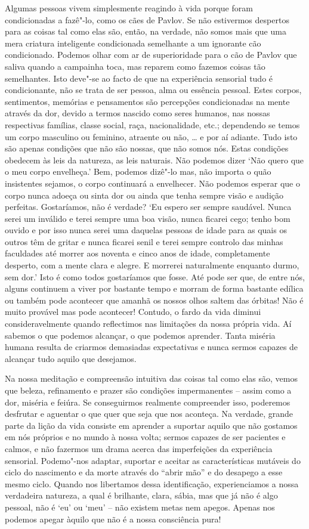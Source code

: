Algumas pessoas vivem simplesmente reagindo à vida porque foram
condicionadas a fazê"-lo, como os cães de Pavlov. Se não estivermos
despertos para as coisas tal como elas são, então, na verdade, não somos
mais que uma mera criatura inteligente condicionada semelhante a um
ignorante cão condicionado. Podemos olhar com ar de superioridade para o
cão de Pavlov que saliva quando a campainha toca, mas reparem como
fazemos coisas tão semelhantes. Isto deve"-se ao facto de que na
experiência sensorial tudo é condicionante, não se trata de ser pessoa,
alma ou essência pessoal. Estes corpos, sentimentos, memórias e
pensamentos são percepções condicionadas na mente através da dor, devido
a termos nascido como seres humanos, nas nossas respectivas famílias,
classe social, raça, nacionalidade, etc.; dependendo se temos um corpo
masculino ou feminino, atraente ou não, \ldots{} e por aí adiante. Tudo
isto são apenas condições que não são nossas, que não somos nós. Estas
condições obedecem às leis da natureza, as leis naturais. Não podemos
dizer `Não quero que o meu corpo envelheça.' Bem, podemos dizê"-lo mas,
não importa o quão insistentes sejamos, o corpo continuará a envelhecer.
Não podemos esperar que o corpo nunca adoeça ou sinta dor ou ainda que
tenha sempre visão e audição perfeitas. Gostaríamos, não é verdade? `Eu
espero ser sempre saudável. Nunca serei um inválido e terei sempre uma
boa visão, nunca ficarei cego; tenho bom ouvido e por isso nunca serei
uma daquelas pessoas de idade para as quais os outros têm de gritar e
nunca ficarei senil e terei sempre controlo das minhas faculdades até
morrer aos noventa e cinco anos de idade, completamente desperto, com a
mente clara e alegre. E morrerei naturalmente enquanto durmo, sem dor.'
Isto é como todos gostaríamos que fosse. Até pode ser que, de entre nós,
alguns continuem a viver por bastante tempo e morram de forma bastante
edílica ou também pode acontecer que amanhã
os nossos olhos saltem das órbitas! Não é muito provável mas pode
acontecer! Contudo, o fardo da vida diminui consideravelmente quando
reflectimos nas limitações da nossa própria vida. Aí sabemos o que
podemos alcançar, o que podemos aprender. Tanta miséria humana resulta
de criarmos demasiadas expectativas e nunca sermos capazes de alcançar
tudo aquilo que desejamos.

Na nossa meditação e compreensão intuitiva das coisas tal como elas são,
vemos que beleza, refinamento e prazer são condições impermanentes --
assim como a dor, miséria e feiúra. Se conseguirmos realmente
compreender isso, poderemos desfrutar e aguentar o que quer que seja que
nos aconteça. Na verdade, grande parte da lição da vida consiste em
aprender a suportar aquilo que não gostamos em nós próprios e no mundo à
nossa volta; sermos capazes de ser pacientes e calmos, e não fazermos um
drama acerca das imperfeições da experiência sensorial. Podemo"-nos
adaptar, suportar e aceitar as características mutáveis do ciclo do
nascimento e da morte através do ``abrir mão'' e do desapego a esse
mesmo ciclo. Quando nos libertamos dessa identificação, experienciamos a
nossa verdadeira natureza, a qual é brilhante, clara, sábia, mas que já
não é algo pessoal, não é `eu' ou `meu' -- não existem metas nem apegos.
Apenas nos podemos apegar àquilo que não é a nossa consciência pura!

